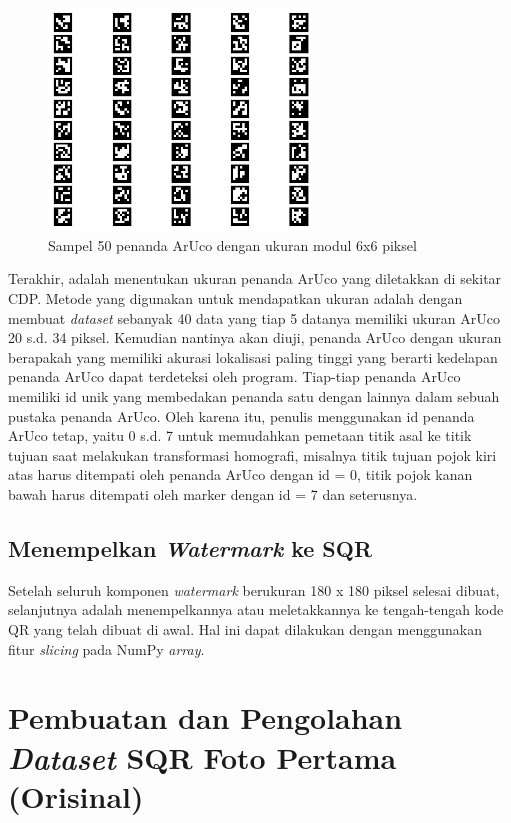 \begin{figure}[!ht]
	\centering
	\includegraphics[width=7cm]{contents/chapter-3/3-aruco6x6.png}
	\caption{Sampel 50 penanda ArUco dengan ukuran modul 6x6 piksel}
	\label{Fig: 3-aruco6x6}
\end{figure}

Terakhir, adalah menentukan ukuran penanda ArUco yang diletakkan di sekitar CDP. Metode yang digunakan untuk mendapatkan ukuran adalah dengan membuat
\emph{dataset} sebanyak 40 data yang tiap 5 datanya memiliki ukuran ArUco 20 s.d. 34 piksel. Kemudian nantinya akan diuji, penanda ArUco dengan ukuran
berapakah yang memiliki akurasi lokalisasi paling tinggi yang berarti kedelapan penanda ArUco dapat terdeteksi oleh program. Tiap-tiap penanda ArUco memiliki
id unik yang membedakan penanda satu dengan lainnya dalam sebuah pustaka penanda ArUco. Oleh karena itu, penulis menggunakan id penanda ArUco tetap, yaitu 0
s.d. 7 untuk memudahkan pemetaan titik asal ke titik tujuan saat melakukan transformasi homografi, misalnya titik tujuan pojok kiri atas harus ditempati oleh
penanda ArUco dengan id = 0, titik pojok kanan bawah harus ditempati oleh marker dengan id = 7 dan seterusnya.

\subsection{Menempelkan \emph{Watermark} ke SQR} Setelah seluruh komponen \emph{watermark} berukuran 180 x 180 piksel selesai dibuat, selanjutnya adalah menempelkannya atau meletakkannya ke
tengah-tengah kode QR yang telah dibuat di awal. Hal ini dapat dilakukan dengan menggunakan fitur \emph{slicing} pada NumPy \emph{array}.

\section{Pembuatan dan Pengolahan \emph{Dataset} SQR Foto Pertama (Orisinal)}
